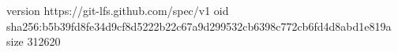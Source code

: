 version https://git-lfs.github.com/spec/v1
oid sha256:b5b39fd8fe34d9cf8d5222b22c67a9d299532cb6398c772cb6fd4d8abd1e819a
size 312620
